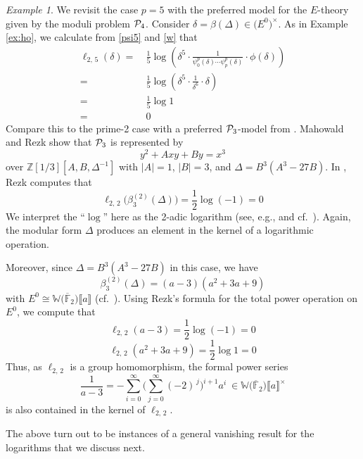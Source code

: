 \documentclass{gtpart}
\theoremstyle{definition}
\theoremstyle{remark}
\newtheorem{ex}[equation]{Example}
\newcommand{\mb}[1]{\mathbb{#1}}
\newcommand{\cF}{\overline {\mb F}}
\newcommand{\CP}{{\cal P}}
\newcommand{\BW}{{\mb W}}
\newcommand{\BZ}{{\mb Z}}
\newcommand{\B}{\beta}
\renewcommand{\D}{\Delta}
\renewcommand{\d}{\delta}
\newcommand{\lb}{\llbracket}
\newcommand{\rb}{\rrbracket}
\renewcommand{\=}{\approx}
\renewcommand{\-}{\sim}
\numberwithin{equation}{section}
\begin{document}
\begin{ex}
 \label{ex:log}
 We revisit the case $p = 5$ with the preferred model for the $E$-theory given 
 by the moduli problem $\CP_4$.  Consider 
 $\d = \B(\D) \in \big( E^0 \big)^{\!\times}$.  As in Example \ref{ex:ho}, we 
 calculate from \eqref{psi5} and \eqref{w} that 
 \begin{equation*}
  \begin{split}
   \ell_{2,\,5}(\d) = & ~ \frac{1}{5} \log \left( \d^5 \cdot 
                        \frac{1}{\psi^p_0(\d) \cdots \psi^p_p(\d)} \cdot 
                        \phi(\d) \right) \\
                    = & ~ \frac{1}{5} \log \left( \d^5 \cdot \frac{1}{\d^6} 
                        \cdot \d \right) \\
                    = & ~ \frac{1}{5} \log 1 \\
                    = & ~ 0 
  \end{split}
 \end{equation*}
 Compare this to the prime-2 case with a preferred $\CP_3$-model from 
 \cite[Proposition 3.2]{tmf3}.  Mahowald and Rezk show that $\CP_3$ is 
 represented by 
 \[
  y^2 + A x y + B y = x^3 
 \]
 over $\BZ[1/3][A, B, \D^{-1}]$ with $|A| = 1$, $|B| = 3$, and 
 $\D = B^3 (A^3 - 27 B)$.  In \cite[2.8]{h2p2}, Rezk computes that 
 \[
  \ell_{2,\,2}\big(\B_3^{(2)}(\D)\big) = \frac{1}{2} \log(-1) = 0 
 \]
 We interpret the ``$\log$'' here as the 2-adic logarithm (see, e.g., 
 \cite[\S IV.1]{padic} and cf.~\cite[10.2.16]{padicinterp}).  Again, the modular 
 form $\D$ produces an element in the kernel of a logarithmic operation.  

 Moreover, since $\D = B^3 (A^3 - 27 B)$ in this case, we have 
 \[
  \B_3^{(2)}(\D) = (a - 3) (a^2 + 3 a + 9) 
 \]
 with $E^0 \cong \BW \big( \cF_2 \big) \lb a \rb$ (cf.~\cite[Section 4]{h2p2}).  
 Using Rezk's formula for the total power operation on $E^0$, we compute that 
 \[
  \ell_{2,\,2}(a - 3) = \frac{1}{2} \log(-1) = 0 
 \]
 \[
  \ell_{2,\,2}(a^2 + 3 a + 9) = \frac{1}{2} \log 1 = 0 
 \]
 Thus, as $\ell_{2,\,2}$ is a group homomorphism, the formal power series 
 \[
  \frac{1}{a - 3} = -\sum_{i = 0}^\infty 
                    \Big( \sum_{j = 0}^\infty (-2)^{\,j} \Big)^{\!i + 1} a^i ~ 
                    \in \BW \big( \cF_2 \big) \lb a \rb^\times 
 \]
 is also contained in the kernel of $\ell_{2,\,2}$.  

 The above turn out to be instances of a general vanishing result for the 
 logarithms that we discuss next.  
\end{ex}
\end{document}
